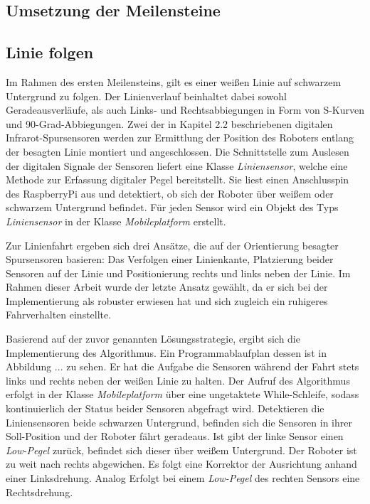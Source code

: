 \documentclass[12pt,a4paper,oneside]{article}
\begin{document}
\begin{spacing}{1.15}
\section{Umsetzung der Meilensteine}

	
\subsection{Linie folgen}
\textit{}	

Im Rahmen des ersten Meilensteins, gilt es einer weißen Linie auf schwarzem Untergrund zu folgen. Der Linienverlauf beinhaltet dabei sowohl Geradeausverläufe, als auch Links- und Rechtsabbiegungen in Form von S-Kurven und 90-Grad-Abbiegungen. Zwei der in Kapitel 2.2 beschriebenen digitalen Infrarot-Spursensoren werden zur Ermittlung der Position des Roboters entlang der besagten Linie montiert und angeschlossen. Die Schnittstelle zum Auslesen der digitalen Signale der Sensoren liefert eine Klasse \textit{Liniensensor}, welche eine Methode zur Erfassung digitaler Pegel bereitstellt. Sie liest einen Anschlusspin des RaspberryPi aus und detektiert, ob sich der Roboter über weißem oder schwarzem Untergrund befindet. Für jeden Sensor wird ein Objekt des Typs \textit{Liniensensor} in der Klasse \textit{Mobileplatform} erstellt.

Zur Linienfahrt ergeben sich drei Ansätze, die auf der Orientierung besagter Spursensoren basieren: Das Verfolgen einer Linienkante, Platzierung beider Sensoren auf der Linie und Positionierung rechts und links neben der Linie. Im Rahmen dieser Arbeit wurde der letzte Ansatz gewählt, da er sich bei der Implementierung als robuster erwiesen hat und sich zugleich ein ruhigeres Fahrverhalten einstellte.

Basierend auf der zuvor genannten Lösungsstrategie, ergibt sich die Implementierung des Algorithmus. Ein Programmablaufplan dessen ist in Abbildung ... zu sehen. Er hat die Aufgabe die Sensoren während der Fahrt stets links und rechts neben der weißen Linie zu halten. Der Aufruf des Algorithmus erfolgt in der Klasse \textit{Mobileplatform} über eine ungetaktete While-Schleife, sodass kontinuierlich der Status beider Sensoren abgefragt wird. Detektieren die Liniensensoren beide schwarzen Untergrund, befinden sich die Sensoren in ihrer Soll-Position und der Roboter fährt geradeaus. Ist gibt der linke Sensor einen \textit{Low-Pegel} zurück, befindet sich dieser über weißem Untergrund. Der Roboter ist zu weit nach rechts abgewichen. Es folgt eine Korrektor der Ausrichtung anhand einer Linksdrehung. Analog Erfolgt bei einem \textit{Low-Pegel} des rechten Sensors eine Rechtsdrehung.


\end{spacing}
\end{document}
